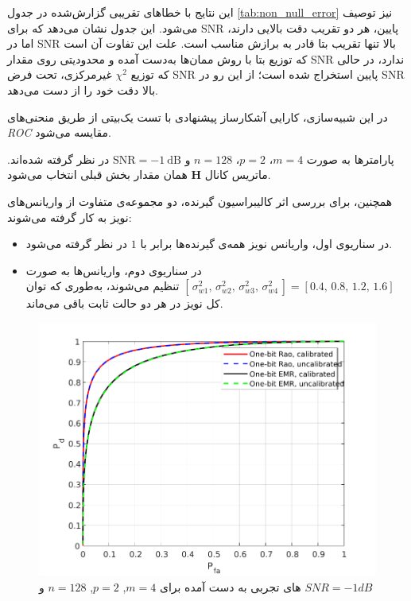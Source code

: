 این نتایج با خطاهای تقریبی گزارش‌شده در جدول \ref{tab:non_null_error} نیز توصیف می‌شود.
این جدول نشان می‌دهد که برای SNR پایین، هر دو تقریب دقت بالایی دارند، 
اما در SNR بالا تنها تقریب بتا قادر به برازش مناسب است.  
علت این تفاوت آن است که توزیع بتا با روش ممان‌ها  به‌دست آمده و محدودیتی روی مقدار SNR ندارد، 
در حالی که توزیع $\chi^{2}$ غیرمرکزی، تحت فرض SNR پایین استخراج شده است؛
از این رو در SNR بالا دقت خود را از دست می‌دهد.


در این شبیه‌سازی، کارایی آشکارساز پیشنهادی با تست  یک‌بیتی از طریق منحنی‌های \emph{ROC} مقایسه می‌شود.  

پارامترها به صورت $m=4$، $p=2$، $n=128$ و $\mathrm{SNR}=-1~\mathrm{dB}$ در نظر گرفته شده‌اند.  
ماتریس کانال $\mathbf{H}$ همان مقدار بخش قبلی انتخاب می‌شود.  

همچنین، برای بررسی اثر کالیبراسیون گیرنده، دو مجموعه‌ی متفاوت از واریانس‌های نویز به کار گرفته می‌شوند:  
\begin{itemize}
	\item در سناریوی اول، واریانس نویز همه‌ی گیرنده‌ها برابر با $1$ در نظر گرفته می‌شود.  
	\item در سناریوی دوم، واریانس‌ها به صورت 
	\([\,\sigma_{w1}^{2},\,\sigma_{w2}^{2},\,\sigma_{w3}^{2},\,\sigma_{w4}^{2}\,] 
	= [0.4,\,0.8,\,1.2,\,1.6]\) تنظیم می‌شوند،  
	به‌طوری که توان کل نویز در هر دو حالت ثابت باقی می‌ماند.  
\end{itemize}

\begin{figure}[!b]
	\centering
	\includegraphics[width=0.8\linewidth]{figs/roc}
	\caption[
	های تجربی
	]{
		های تجربی به دست آمده برای
		$m=4$, $p=2$, $n=128$ و
		$SNR=-1dB$
	}
	\label{fig:ROC}
\end{figure} 

